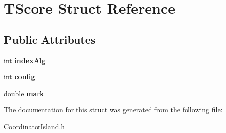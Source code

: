 \hypertarget{structTScore}{}\section{T\+Score Struct Reference}
\label{structTScore}
\subsection*{Public Attributes}
\begin{DoxyCompactItemize}
\item 
\mbox{\label{structTScore_ae3d5f4e9c335453a0d519eca8ace7492}} 
int {\bfseries index\+Alg}
\item 
\mbox{\label{structTScore_afb87309be1935a24c855666128cc7b36}} 
int {\bfseries config}
\item 
\mbox{\label{structTScore_a2371aaa2bdaaec3bd2d2d51333180db5}} 
double {\bfseries mark}
\end{DoxyCompactItemize}


The documentation for this struct was generated from the following file\+:\begin{DoxyCompactItemize}
\item 
Coordinator\+Island.\+h\end{DoxyCompactItemize}
